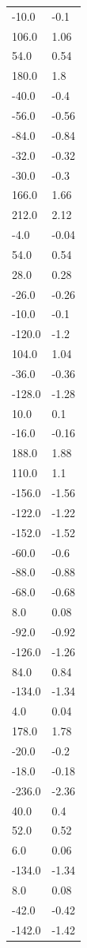 \begin{longtable}{ll}
-10.0 & -0.1 \\
106.0 & 1.06 \\
54.0 & 0.54 \\
180.0 & 1.8 \\
-40.0 & -0.4 \\
-56.0 & -0.56 \\
-84.0 & -0.84 \\
-32.0 & -0.32 \\
-30.0 & -0.3 \\
166.0 & 1.66 \\
212.0 & 2.12 \\
-4.0 & -0.04 \\
54.0 & 0.54 \\
28.0 & 0.28 \\
-26.0 & -0.26 \\
-10.0 & -0.1 \\
-120.0 & -1.2 \\
104.0 & 1.04 \\
-36.0 & -0.36 \\
-128.0 & -1.28 \\
10.0 & 0.1 \\
-16.0 & -0.16 \\
188.0 & 1.88 \\
110.0 & 1.1 \\
-156.0 & -1.56 \\
-122.0 & -1.22 \\
-152.0 & -1.52 \\
-60.0 & -0.6 \\
-88.0 & -0.88 \\
-68.0 & -0.68 \\
8.0 & 0.08 \\
-92.0 & -0.92 \\
-126.0 & -1.26 \\
84.0 & 0.84 \\
-134.0 & -1.34 \\
4.0 & 0.04 \\
178.0 & 1.78 \\
-20.0 & -0.2 \\
-18.0 & -0.18 \\
-236.0 & -2.36 \\
40.0 & 0.4 \\
52.0 & 0.52 \\
6.0 & 0.06 \\
-134.0 & -1.34 \\
8.0 & 0.08 \\
-42.0 & -0.42 \\
-142.0 & -1.42 \\

\end{longtable}
